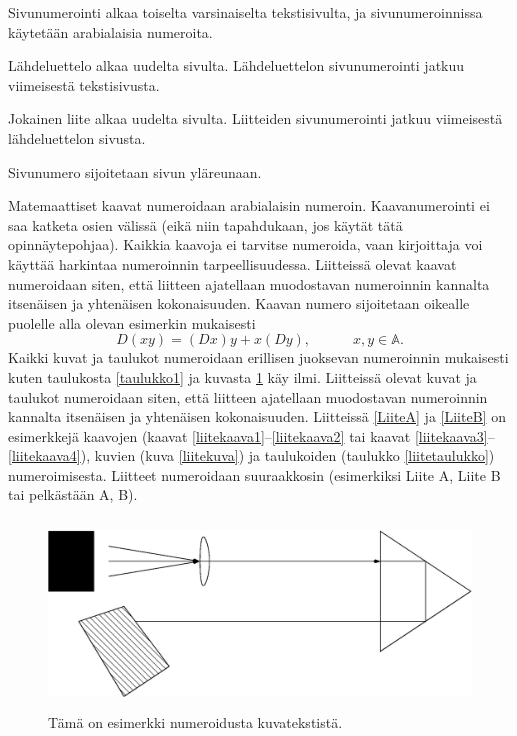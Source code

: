 \documentclass[english,12pt,a4paper,pdftex]{article}
\begin{document}
Sivunumerointi alkaa toiselta varsinaiselta tekstisivulta, ja
sivunumeroinnissa käytetään arabialaisia numeroita.

Lähdeluettelo alkaa uudelta sivulta. Lähdeluettelon sivunumerointi
jatkuu viimeisestä tekstisivusta.

Jokainen liite alkaa uudelta sivulta. Liitteiden sivunumerointi
jatkuu viimeisestä lähdeluettelon sivusta.

Sivunumero sijoitetaan sivun yläreunaan.

Matemaattiset kaavat numeroidaan arabialaisin
numeroin. Kaavanumerointi ei saa katketa osien välissä (eikä niin
tapahdukaan, jos käytät tätä opinnäytepohjaa). Kaikkia kaavoja ei tarvitse
numeroida, vaan kirjoittaja voi käyttää harkintaa numeroinnin
tarpeellisuudessa.  Liitteissä olevat kaavat numeroidaan siten, että
liitteen ajatellaan muodostavan numeroinnin kannalta itsenäisen ja
yhtenäisen kokonaisuuden. Kaavan numero sijoitetaan oikealle puolelle
alla olevan esimerkin mukaisesti
\begin{equation}
D(xy) = (Dx)y + x(Dy),  \hspace{3em} x,y \in \mathbb{A}.
\end{equation}
Kaikki kuvat ja taulukot numeroidaan erillisen juoksevan numeroinnin
mukaisesti kuten taulukosta \ref{taulukko1} ja kuvasta \ref{kuva1} käy
ilmi.  Liitteissä olevat kuvat ja taulukot numeroidaan siten, että
liitteen ajatellaan muodostavan numeroinnin kannalta itsenäisen ja
yhtenäisen kokonaisuuden. Liitteissä \ref{LiiteA} ja \ref{LiiteB} on
esimerkkejä kaavojen (kaavat \ref{liitekaava1}--\ref{liitekaava2} tai
kaavat \ref{liitekaava3}--\ref{liitekaava4}), kuvien (kuva
\ref{liitekuva}) ja taulukoiden (taulukko \ref{liitetaulukko})
numeroimisesta.  Liitteet numeroidaan suuraakkosin (esimerkiksi Liite
A, Liite B tai pelkästään A, B).

\begin{figure}[htb]
\centering \includegraphics[height=5cm]{assets/kuva1}
\caption{Tämä on esimerkki numeroidusta kuvatekstistä. \label{kuva1}}
\end{figure}
\end{document}
